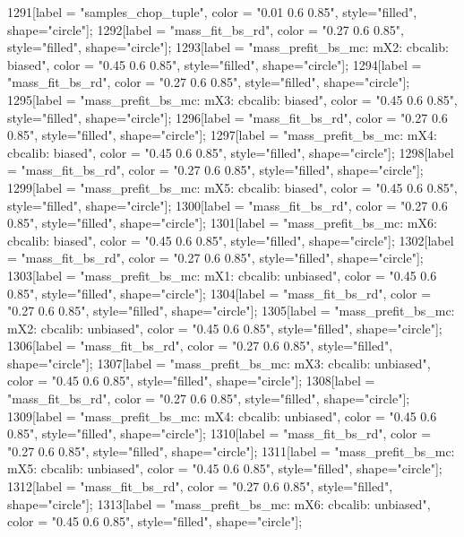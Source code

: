 {	1291[label = "samples_chop_tuple", color = "0.01 0.6 0.85", style="filled", shape="circle"];
	1292[label = "mass_fit_bs_rd", color = "0.27 0.6 0.85", style="filled", shape="circle"];
	1293[label = "mass_prefit_bs_mc\nmassbin: mX2\nmassmodel: cbcalib\ntrigger: biased", color = "0.45 0.6 0.85", style="filled", shape="circle"];
	1294[label = "mass_fit_bs_rd", color = "0.27 0.6 0.85", style="filled", shape="circle"];
	1295[label = "mass_prefit_bs_mc\nmassbin: mX3\nmassmodel: cbcalib\ntrigger: biased", color = "0.45 0.6 0.85", style="filled", shape="circle"];
	1296[label = "mass_fit_bs_rd", color = "0.27 0.6 0.85", style="filled", shape="circle"];
	1297[label = "mass_prefit_bs_mc\nmassbin: mX4\nmassmodel: cbcalib\ntrigger: biased", color = "0.45 0.6 0.85", style="filled", shape="circle"];
	1298[label = "mass_fit_bs_rd", color = "0.27 0.6 0.85", style="filled", shape="circle"];
	1299[label = "mass_prefit_bs_mc\nmassbin: mX5\nmassmodel: cbcalib\ntrigger: biased", color = "0.45 0.6 0.85", style="filled", shape="circle"];
	1300[label = "mass_fit_bs_rd", color = "0.27 0.6 0.85", style="filled", shape="circle"];
	1301[label = "mass_prefit_bs_mc\nmassbin: mX6\nmassmodel: cbcalib\ntrigger: biased", color = "0.45 0.6 0.85", style="filled", shape="circle"];
	1302[label = "mass_fit_bs_rd", color = "0.27 0.6 0.85", style="filled", shape="circle"];
	1303[label = "mass_prefit_bs_mc\nmassbin: mX1\nmassmodel: cbcalib\ntrigger: unbiased", color = "0.45 0.6 0.85", style="filled", shape="circle"];
	1304[label = "mass_fit_bs_rd", color = "0.27 0.6 0.85", style="filled", shape="circle"];
	1305[label = "mass_prefit_bs_mc\nmassbin: mX2\nmassmodel: cbcalib\ntrigger: unbiased", color = "0.45 0.6 0.85", style="filled", shape="circle"];
	1306[label = "mass_fit_bs_rd", color = "0.27 0.6 0.85", style="filled", shape="circle"];
	1307[label = "mass_prefit_bs_mc\nmassbin: mX3\nmassmodel: cbcalib\ntrigger: unbiased", color = "0.45 0.6 0.85", style="filled", shape="circle"];
	1308[label = "mass_fit_bs_rd", color = "0.27 0.6 0.85", style="filled", shape="circle"];
	1309[label = "mass_prefit_bs_mc\nmassbin: mX4\nmassmodel: cbcalib\ntrigger: unbiased", color = "0.45 0.6 0.85", style="filled", shape="circle"];
	1310[label = "mass_fit_bs_rd", color = "0.27 0.6 0.85", style="filled", shape="circle"];
	1311[label = "mass_prefit_bs_mc\nmassbin: mX5\nmassmodel: cbcalib\ntrigger: unbiased", color = "0.45 0.6 0.85", style="filled", shape="circle"];
	1312[label = "mass_fit_bs_rd", color = "0.27 0.6 0.85", style="filled", shape="circle"];
	1313[label = "mass_prefit_bs_mc\nmassbin: mX6\nmassmodel: cbcalib\ntrigger: unbiased", color = "0.45 0.6 0.85", style="filled", shape="circle"];
}
